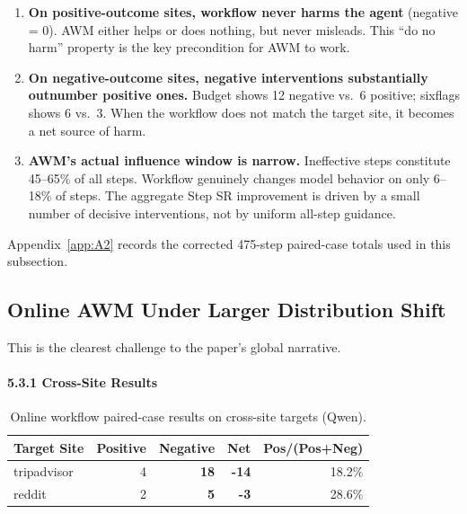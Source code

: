 \documentclass{article}
\begin{document}
\begin{enumerate}
\def\labelenumi{\arabic{enumi}.}
\item
  \textbf{On positive-outcome sites, workflow never harms the agent} (negative
  = 0). AWM either helps or does nothing, but never misleads. This ``do
  no harm'' property is the key precondition for AWM to work.
\item
  \textbf{On negative-outcome sites, negative interventions substantially
  outnumber positive ones.} Budget shows 12 negative vs.~6 positive;
  sixflags shows 6 vs.~3. When the workflow does not match the target
  site, it becomes a net source of harm.
\item
  \textbf{AWM's actual influence window is narrow.} Ineffective steps
  constitute 45--65\% of all steps. Workflow genuinely changes model
  behavior on only 6--18\% of steps. The aggregate Step SR improvement
  is driven by a small number of decisive interventions, not by uniform
  all-step guidance.
\end{enumerate}

Appendix~\ref{app:A2} records the corrected 475-step paired-case totals
used in this subsection.

\subsection{Online AWM Under Larger Distribution
Shift}\label{c2-online-awm-under-larger-distribution-shift}

This is the clearest challenge to the paper's global narrative.

\paragraph{5.3.1 Cross-Site Results}\label{cross-site-results}

{\begin{longtable}[]{@{}lrrrr@{}}
\caption{Online workflow paired-case results on cross-site targets (Qwen).}\\

\toprule\noalign{}
Target Site & Positive & Negative & Net & Pos/(Pos+Neg) \\
\midrule\noalign{}
\endhead
\bottomrule\noalign{}
\endlastfoot
tripadvisor & 4 & \textbf{18} & \textbf{-14} & 18.2\% \\
reddit & 2 & \textbf{5} & \textbf{-3} & 28.6\% \\
\end{longtable}
\label{tab:online-workflow-paired-case-results-on-cross-site-qwen-main}
}
\end{document}
